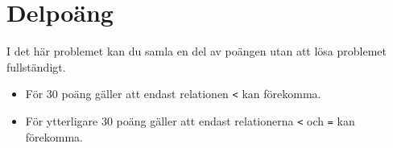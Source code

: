 \section*{Delpoäng}

I det här problemet kan du samla en del av poängen utan att
lösa problemet fullständigt.

\begin{itemize}
    \item För 30 poäng gäller att endast relationen \texttt{<} kan förekomma.
    \item För ytterligare 30 poäng gäller att endast relationerna \texttt{<} och \texttt{=} kan förekomma.
\end{itemize}
